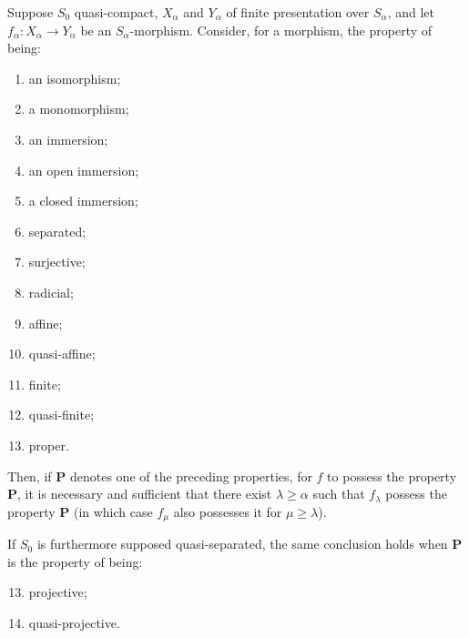 \begin{theorem}[8.10.5]
\label{IV.8.10.5}
Suppose $S_0$ quasi-compact, $X_\alpha$ and $Y_\alpha$ of finite presentation over $S_\alpha$, and let $f_\alpha:X_\alpha\to Y_\alpha$ be an $S_\alpha$-morphism.
Consider, for a morphism, the property of being:
\begin{enumerate}[label=(\roman*)]
\item an isomorphism;
\item[\rm(i\,\emph{bis})] a monomorphism;
\item an immersion;
\item an open immersion;
\item a closed immersion;
\item separated;
\item surjective;
\item radicial;
\item affine;
\item quasi-affine;
\item finite;
\item quasi-finite;
\item proper.
\end{enumerate}
Then, if $\mathbf{P}$ denotes one of the preceding properties, for $f$ to possess the property $\mathbf{P}$, it is necessary and sufficient that there exist $\lambda\geqslant\alpha$ such that $f_\lambda$ possess the property $\mathbf{P}$ (in which case $f_\mu$ also possesses it for $\mu\geqslant\lambda$).

If $S_0$ is furthermore supposed quasi-separated, the same conclusion holds when $\mathbf{P}$ is the property of being:
\begin{enumerate}[label=(\roman*)]
\setcounter{enumi}{12}
\item projective;
\item quasi-projective.
\end{enumerate}
\end{theorem}


